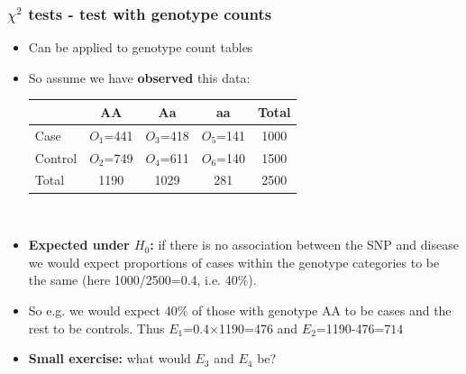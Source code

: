 \documentclass[xcolor=pdftex,dvipsnames,table,10pt]{beamer}
\begin{document}
\begin{frame}
\frametitle{$\chi^2$ tests - test with genotype counts}
\vspace{-.7cm}
\small
  \begin{itemize}\setlength{\itemindent}{-2.25em}
   \item Can be applied to genotype count tables %
   \item So assume we have \textbf{observed} this data:
   \\\vspace{.2cm}
   \footnotesize
\hspace{-0.5cm}\begin{tabular}{|l|c|c|c|c|}
\hline
  & AA & Aa & aa & Total \\
\hline
Case & $O_1$=441 & $O_3$=418 & $O_5$=141 & 1000\\
\hline
Control & $O_2$=749 & $O_4$=611 & $O_6$=140 & 1500  \\
\hline
Total & 1190 & 1029 & 281 & 2500\\
\hline
\end{tabular}\\\vspace{0.2cm}
 \item<2-> \small \textbf{Expected under $H_0$:} if there is no association between the SNP and disease \\\hspace{-0.7cm}we would expect proportions of cases within the genotype categories to be\\\hspace{-0.7cm}the same (here 1000/2500=0.4, i.e. 40\%). 
 \item<3-> \small So e.g. we would expect 40\% of those with genotype AA to be cases and the\\\hspace{-0.7cm}rest to be controls. Thus $E_1$=0.4$\times$1190=476 and $E_2$=1190-476=$714$
\item<4-> \small \textbf{Small exercise:} what would $E_3$ and $E_4$ be? %
  \end{itemize}
\end{frame}
\end{document}
